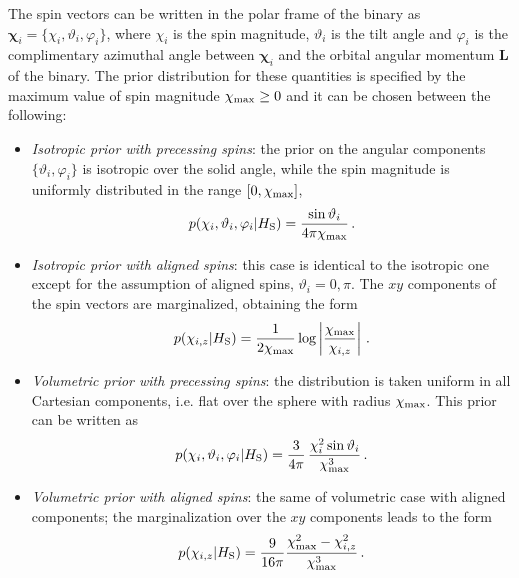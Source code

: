 \documentclass[prd,aps,twocolumn,a4paper,showkeys,nofootinbib,floatfix]{revtex4-1}
\newcommand{\be}{\begin{equation}}
\newcommand{\ee}{\end{equation}}
\def\spin{\boldsymbol{\chi}}
\begin{document}
 The spin vectors can be written in the polar frame of the binary as 
 $\spin_i = \{\chi_i , \vartheta_i, \varphi_i\}$, where $\chi_i$ is the spin magnitude, $\vartheta_i$ 
 is the tilt angle and $\varphi_i$ is the complimentary azimuthal angle between $\spin_i$ and the 
 orbital angular momentum $\textbf{L}$ of the binary.
 The prior distribution for these quantities is specified 
 by the maximum value of spin magnitude $\chi_{\rm max}\ge 0$ and it 
 can be chosen between the following:
 \begin{itemize}
 	\item {\it Isotropic prior with precessing spins}: 
 			the prior on the angular components $\{\vartheta_i,\varphi_i\}$ 
 			is isotropic over the solid angle,
 			while the spin magnitude is uniformly distributed in the range $[0,\chi_{\rm max}]$,
 			\be
 			\label{eq:prior-precess-isotropic}
 			p(\chi_i , \vartheta_i, \varphi_i|H_{\rm S}) = \frac{\sin\vartheta_i}{4\pi \chi_{\rm max}}\,.
 			\ee
	\item {\it Isotropic prior with aligned spins}:
			this case is identical to the isotropic one 
			except for the assumption of aligned spins, $\vartheta_i = 0,\pi$. 
			The $xy$ components of the spin vectors are marginalized, 
			obtaining the form~\cite{Lange:2018pyp}
			\be
			\label{eq:prior-aligned-isotropic}
			p(\chi_{i,z}|H_{\rm S}) = \frac{1}{2 \chi_{\rm max}} \log \left|\frac{\chi_{\rm max}}{\chi_{i,z}} \right|\,.
			\ee
 	\item {\it Volumetric prior with precessing spins}:
 				the distribution is taken uniform in all Cartesian components,
 				i.e. flat over the sphere with radius $\chi_{\rm max}$. 
 				This prior can be written as 
 			\be
			\label{eq:prior-precess-volumetric}
			p(\chi_i , \vartheta_i, \varphi_i|H_{\rm S}) =\frac{3}{4\pi} \,
			\frac{ \chi_i^2 \sin\vartheta_i}{\chi^3_{\rm max}}\,.
			\ee
 	\item {\it Volumetric prior with aligned spins}:
 			the same of volumetric case with aligned components; 
 			the marginalization over the $xy$ components leads to the form
 						\be
 			\label{eq:prior-aligned-volumetric}
 			p(\chi_{i,z}|H_{\rm S}) = \frac{9}{16\pi} \frac{ \chi^2_{\rm max} - \chi_{i,z}^2}{ \chi^3_{\rm max}}\,.
 			\ee
 	\end{itemize} 
 
\end{document}
